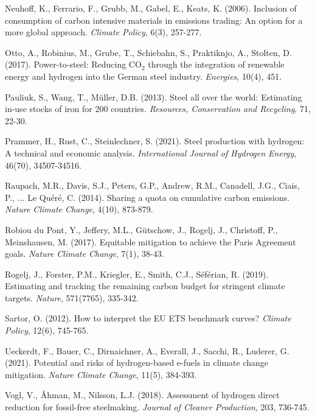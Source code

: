 \documentclass[preprint,1p,authoryear]{elsarticle}
\begin{document}
\begin{thebibliography}{99}
 Neuhoff, K., Ferrario, F., Grubb, M., Gabel, E., Keats, K. (2006). Inclusion of consumption of carbon intensive materials in emissions trading: An option for a more global approach. \textit{Climate Policy}, 6(3), 257-277.

 Otto, A., Robinius, M., Grube, T., Schiebahn, S., Praktiknjo, A., Stolten, D. (2017). Power-to-steel: Reducing CO$_2$ through the integration of renewable energy and hydrogen into the German steel industry. \textit{Energies}, 10(4), 451.

 Pauliuk, S., Wang, T., Müller, D.B. (2013). Steel all over the world: Estimating in-use stocks of iron for 200 countries. \textit{Resources, Conservation and Recycling}, 71, 22-30.

 Prammer, H., Rust, C., Steinlechner, S. (2021). Steel production with hydrogen: A technical and economic analysis. \textit{International Journal of Hydrogen Energy}, 46(70), 34507-34516.

 Raupach, M.R., Davis, S.J., Peters, G.P., Andrew, R.M., Canadell, J.G., Ciais, P., ... Le Quéré, C. (2014). Sharing a quota on cumulative carbon emissions. \textit{Nature Climate Change}, 4(10), 873-879.

 Robiou du Pont, Y., Jeffery, M.L., Gütschow, J., Rogelj, J., Christoff, P., Meinshausen, M. (2017). Equitable mitigation to achieve the Paris Agreement goals. \textit{Nature Climate Change}, 7(1), 38-43.

 Rogelj, J., Forster, P.M., Kriegler, E., Smith, C.J., Séférian, R. (2019). Estimating and tracking the remaining carbon budget for stringent climate targets. \textit{Nature}, 571(7765), 335-342.

 Sartor, O. (2012). How to interpret the EU ETS benchmark curves? \textit{Climate Policy}, 12(6), 745-765.

 Ueckerdt, F., Bauer, C., Dirnaichner, A., Everall, J., Sacchi, R., Luderer, G. (2021). Potential and risks of hydrogen-based e-fuels in climate change mitigation. \textit{Nature Climate Change}, 11(5), 384-393.

 Vogl, V., Åhman, M., Nilsson, L.J. (2018). Assessment of hydrogen direct reduction for fossil-free steelmaking. \textit{Journal of Cleaner Production}, 203, 736-745.


\end{thebibliography}
\end{document}
